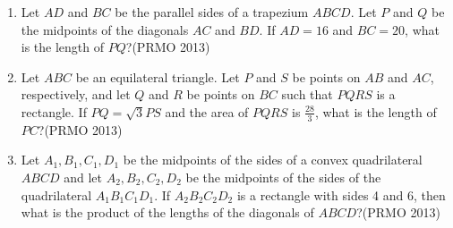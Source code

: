 \begin{enumerate}[label=\thesubsection.\arabic*,ref=\thesubsection.\theenumi]
\item Let $ AD $ and $ BC $ be the parallel sides of a trapezium $ ABCD $. Let $ P $ and $ Q $ be the midpoints of the diagonals $ AC $ and $ BD $. If $ AD = 16 $ and $ BC = 20 $, what is the length of $ PQ $?\hfill(PRMO 2013)

\item Let $ ABC $ be an equilateral triangle. Let $ P $ and $ S $ be points on $ AB $ and $ AC $, respectively, and let $ Q $ and $ R $ be points on $ BC $ such that $ PQRS $ is a rectangle. If $ PQ = \sqrt{3} PS $ and the area of $ PQRS $ is $ \frac{28}{3} $, what is the length of $ PC $?\hfill(PRMO 2013)

\item Let $ A_1, B_1, C_1, D_1 $ be the midpoints of the sides of a convex quadrilateral $ ABCD $ and let $ A_2, B_2, C_2, D_2 $ be the midpoints of the sides of the quadrilateral $ A_1B_1C_1D_1 $. If $ A_2B_2C_2D_2 $ is a rectangle with sides 4 and 6, then what is the product of the lengths of the diagonals of $ ABCD $?\hfill(PRMO 2013)



\end{enumerate}
